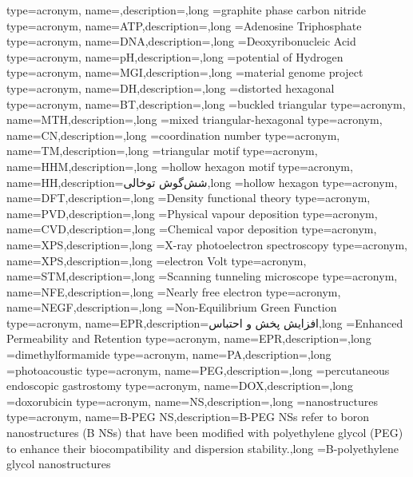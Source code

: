 {type=acronym, name={},description={},long ={graphite phase carbon nitride}
}
{type=acronym, name={ATP},description={},long ={Adenosine Triphosphate}
}
{type=acronym, name={DNA},description={},long ={Deoxyribonucleic Acid}
}
{type=acronym, name={pH},description={},long ={potential of Hydrogen}
}
{type=acronym, name={MGI},description={},long ={material genome project}
}
{type=acronym, name={DH},description={},long ={distorted hexagonal}
}
{type=acronym, name={BT},description={},long ={buckled triangular}
}
{type=acronym, name={MTH},description={},long ={mixed triangular-hexagonal}
}
{type=acronym, name={CN},description={},long ={coordination number}
}
{type=acronym, name={TM},description={},long ={triangular motif}
}
{type=acronym, name={HHM},description={},long ={hollow hexagon motif}
}
{type=acronym, name={HH},description={شش‌گوش توخالی},long ={hollow hexagon}
}
{type=acronym, name={DFT},description={},long ={Density functional theory}
}
{type=acronym, name={PVD},description={},long ={Physical vapour deposition}
}
{type=acronym, name={CVD},description={},long ={Chemical vapor deposition}
}
{type=acronym, name={XPS},description={},long ={X-ray photoelectron spectroscopy}
}
{type=acronym, name={XPS},description={},long ={electron Volt}
}
{type=acronym, name={STM},description={},long ={Scanning tunneling microscope}
}
{type=acronym, name={NFE},description={},long ={Nearly free electron}
}
{type=acronym, name={NEGF},description={},long ={Non-Equilibrium Green Function}
}
{type=acronym, name={EPR},description={افزایش پخش و احتباس},long ={Enhanced Permeability and Retention}
}
{type=acronym, name={EPR},description={},long ={dimethylformamide}
}
{type=acronym, name={PA},description={},long ={photoacoustic}
}
{type=acronym, name={PEG},description={},long ={percutaneous endoscopic gastrostomy}
}
{type=acronym, name={DOX},description={},long ={doxorubicin}
}
{type=acronym, name={NS},description={},long ={nanostructures}
}
{type=acronym, name={B-PEG NS},description={B-PEG NSs refer to boron nanostructures (B NSs) that have been modified with polyethylene glycol (PEG) to enhance their biocompatibility and dispersion stability.},long ={B-polyethylene glycol nanostructures }
}

